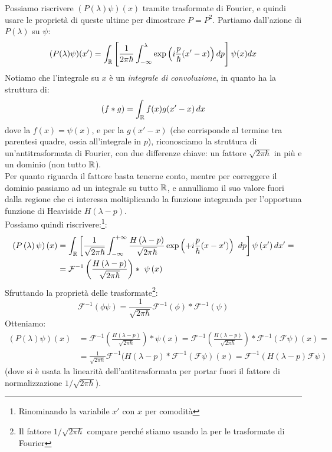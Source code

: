 \documentclass[../../FisicaTeorica.tex]{subfiles}
\begin{document}
Possiamo riscrivere $(P(\lambda)\psi)(x)$ tramite trasformate di Fourier, e quindi usare le proprietà di queste ultime per dimostrare $P=P^2$. Partiamo dall'azione di $P(\lambda)$ su $\psi$:
\[
(P(\lambda)\psi)(x') = \int_{\mathbb{R}}\left[\frac{1}{2\pi \hbar} \int_{-\infty}^\lambda \exp\left (i\frac{p}{\hbar}(x'-x)\right )dp\right ]\psi(x) dx
\]
Notiamo che l'integrale  su $x$ è un \textit{integrale di convoluzione}, in quanto ha la struttura di:
\[
(f*g) = \int_{\mathbb{R}} f(x)g(x'-x)\,dx
\]
dove la $f(x) = \psi(x)$, e per la $g(x'-x)$ (che corrisponde al termine tra parentesi quadre, ossia all'integrale in $p$), riconosciamo la struttura di un'antitrasformata di Fourier, con due differenze chiave: un fattore $\sqrt{2\pi\hbar}$ in più e un dominio  (non tutto $\mathbb{R}$).\\
Per quanto riguarda il fattore basta tenerne conto, mentre per correggere il dominio passiamo ad un integrale su tutto $\mathbb{R}$, e annulliamo il suo valore fuori dalla regione che ci interessa moltiplicando la funzione integranda per l'opportuna funzione di Heaviside $H(\lambda-p)$.\\
Possiamo quindi riscrivere:\footnote{Rinominando la variabile $x'$ con $x$ per comodità}:
\begin{align*}
\left(P\left(\lambda\right)\psi\right)\left(x\right)
&=
\int_{\mathbb{R}} \left [\frac{1}{\sqrt{2\pi\hbar}}\int_{-\infty}^{+\infty}\frac{H\left(\lambda-p\right)}{\sqrt{2\pi\hbar}}\exp\left (+{i\frac{p}{\hbar}(x-x')}\right)\ dp\right ]\psi\left(x'\right)dx'=\\
&=\mathcal{F}^{-1}\left(\frac{H\left(\lambda-p\right)}{\sqrt{2\pi\hbar}} \right )*\ \psi\left(x\right)
\end{align*}
Sfruttando  la proprietà delle trasformate\footnote{Il fattore $1/\sqrt{2\pi\hbar}$ compare perché stiamo usando la  per le trasformate di Fourier}:
\[
\mathcal{F}^{-1}(\phi \psi) =\frac{1}{\sqrt{2\pi\hbar}} \mathcal{F}^{-1}(\phi) * \mathcal{F}^{-1}(\psi)
\]
Otteniamo:
\begin{align*}
(P(\lambda)\psi)(x) &= \mathcal{F}^{-1}\left ( \frac{H(\lambda-p)}{\sqrt{2\pi\hbar}}\right ) * \psi(x) = 
\mathcal{F}^{-1}\left (\frac{H(\lambda-p)}{\sqrt{2\pi\hbar}}\right ) * \mathcal{F}^{-1}(\mathcal{F}\psi)(x) =\\
&= \frac{1}{\sqrt{2\pi\hbar}} \mathcal{F}^{-1}(H(\lambda-p)*\mathcal{F}^{-1}(\mathcal{F}\psi)(x) 
= \mathcal{F}^{-1}(H(\lambda-p)\mathcal{F}\psi)
\end{align*}
(dove si è usata la linearità dell'antitrasformata per portar fuori il fattore di normalizzazione $1/\sqrt{2\pi\hbar}$).\\
\end{document}
